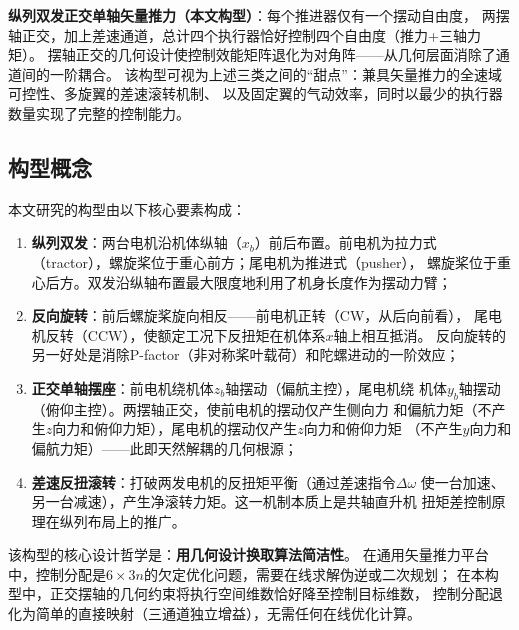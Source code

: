 \documentclass[a4paper,12pt]{ctexart}
\theoremstyle{plain}
\theoremstyle{definition}
\begin{document}
\textbf{纵列双发正交单轴矢量推力（本文构型）}：每个推进器仅有一个摆动自由度，
两摆轴正交，加上差速通道，总计四个执行器恰好控制四个自由度（推力+三轴力矩）。
摆轴正交的几何设计使控制效能矩阵退化为对角阵——从几何层面消除了通道间的一阶耦合。
该构型可视为上述三类之间的“甜点”：兼具矢量推力的全速域可控性、多旋翼的差速滚转机制、
以及固定翼的气动效率，同时以最少的执行器数量实现了完整的控制能力。

\subsection{构型概念}

本文研究的构型由以下核心要素构成：

\begin{enumerate}[label=(\arabic*)]
    \item \textbf{纵列双发}：两台电机沿机体纵轴（$x_b$）前后布置。前电机为拉力式
          （tractor），螺旋桨位于重心前方；尾电机为推进式（pusher），
          螺旋桨位于重心后方。双发沿纵轴布置最大限度地利用了机身长度作为摆动力臂；
    \item \textbf{反向旋转}：前后螺旋桨旋向相反——前电机正转（CW，从后向前看），
          尾电机反转（CCW），使额定工况下反扭矩在机体系$x$轴上相互抵消。
          反向旋转的另一好处是消除P-factor（非对称桨叶载荷）和陀螺进动的一阶效应；
    \item \textbf{正交单轴摆座}：前电机绕机体$z_b$轴摆动（偏航主控），尾电机绕
          机体$y_b$轴摆动（俯仰主控）。两摆轴正交，使前电机的摆动仅产生侧向力
          和偏航力矩（不产生$z$向力和俯仰力矩），尾电机的摆动仅产生$z$向力和俯仰力矩
          （不产生$y$向力和偏航力矩）——此即天然解耦的几何根源；
    \item \textbf{差速反扭滚转}：打破两发电机的反扭矩平衡（通过差速指令$\Delta\omega$
          使一台加速、另一台减速），产生净滚转力矩。这一机制本质上是共轴直升机
          扭矩差控制原理在纵列布局上的推广。
\end{enumerate}

该构型的核心设计哲学是：\textbf{用几何设计换取算法简洁性}。
在通用矢量推力平台中，控制分配是$6 \times 3n$的欠定优化问题，需要在线求解伪逆或二次规划；
在本构型中，正交摆轴的几何约束将执行空间维数恰好降至控制目标维数，
控制分配退化为简单的直接映射（三通道独立增益），无需任何在线优化计算。
\end{document}
